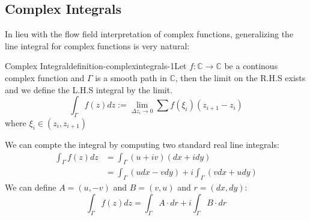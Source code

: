 \subsection{Complex Integrals}

In lieu with the flow field interpretation of complex functions, generalizing the line integral for complex functions is very natural:

\begin{mystthmdefinition}{Complex Integral}{definition-complexintegrals-1}Let $f:\mathbb{C}\to \mathbb{C}$ be a continous complex function and $\Gamma$ is a smooth path in $\mathbb{C}$, then the limit on the R.H.S exists and we define the L.H.S
integral by the limit.
\begin{equation}
\int_{\Gamma} f(z)dz:=\lim_{\Delta z_i\to 0}\sum f(\xi_i)(z_{i+1}-z_i)
\end{equation}
where $\xi_i \in (z_i,z_{i+1})$

\end{mystthmdefinition}
We can compte the integral by computing two standard real line integrals:
\begin{equation}
\begin{aligned}
\int_{\Gamma} f(z)dz &=\int_{\Gamma} (u+iv)(dx+idy) \\
&=\int_{\Gamma} (udx-vdy) + i\int_{\Gamma} (vdx+udy)
\end{aligned}
\end{equation}
We can define $A=(u, -v)$ and $B=(v,u)$ and $r=(dx,dy)$:
\begin{equation}
\int_{\Gamma} f(z)dz = \int_{\Gamma} A\cdot dr + i\int_{\Gamma}B\cdot dr
\end{equation}